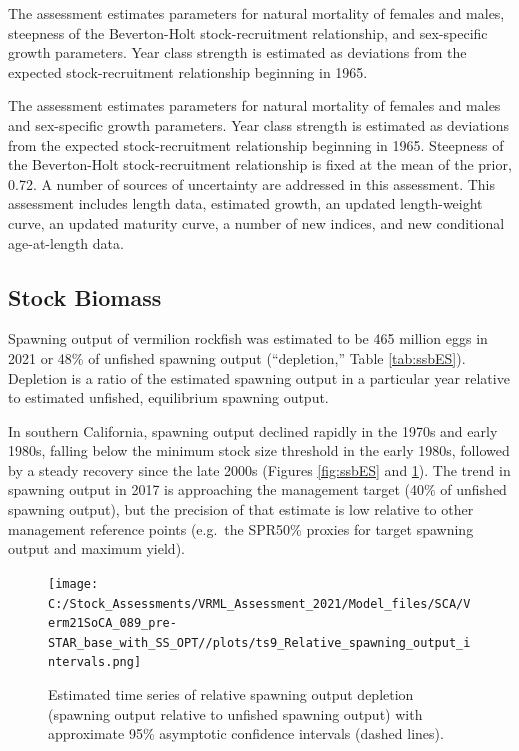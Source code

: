 \documentclass[11pt,
  english,
  a4paper,
]{article}
\begin{document}
The assessment estimates parameters for natural mortality of females and males, steepness of the Beverton-Holt stock-recruitment relationship, and sex-specific growth parameters. Year class strength is estimated as deviations from the expected stock-recruitment relationship beginning in 1965.

The assessment estimates parameters for natural mortality of females and males and sex-specific growth parameters. Year class strength is estimated as deviations from the expected stock-recruitment relationship beginning in 1965. Steepness of the Beverton-Holt stock-recruitment relationship is fixed at the mean of the prior, 0.72. A number of sources of uncertainty are addressed in this assessment. This assessment includes length data, estimated growth, an updated length-weight curve, an updated maturity curve, a number of new indices, and new conditional age-at-length data.

\FloatBarrier


\hypertarget{stock-biomass}{%
\subsection*{Stock Biomass}\label{stock-biomass}}

\leavevmode\tagmcend\tagstructend

Spawning output of vermilion rockfish was estimated to be 465 million eggs in 2021 or 48\% of unfished spawning output (``depletion,'' Table \ref{tab:ssbES}). Depletion is a ratio of the estimated spawning output in a particular year relative to estimated unfished, equilibrium spawning output.

In southern California, spawning output declined rapidly in the 1970s and early 1980s, falling below the minimum stock size threshold in the early 1980s, followed by a steady recovery since the late 2000s (Figures \ref{fig:ssbES} and \ref{fig:deplES}). The trend in spawning output in 2017 is approaching the management target (40\% of unfished spawning output), but the precision of that estimate is low relative to other management reference points (e.g.~the SPR50\% proxies for target spawning output and maximum yield).

\begin{figure}
\centering
\texttt{[image: C:/Stock\_Assessments/VRML\_Assessment\_2021/Model\_files/SCA/Verm21SoCA\_089\_pre-STAR\_base\_with\_SS\_OPT//plots/ts9\_Relative\_spawning\_output\_intervals.png]}
\caption{Estimated time series of relative spawning output depletion (spawning output relative to unfished spawning output) with approximate 95\% asymptotic confidence intervals (dashed lines).\label{fig:deplES}}
\end{figure}
\end{document}
